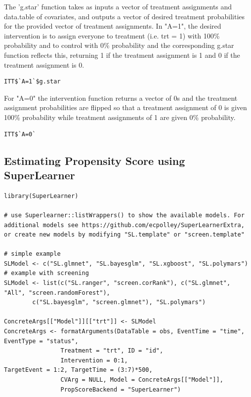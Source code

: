 \documentclass{report}
\newcommand{\1}{\ensuremath{\mathbf{1}}}
\begin{document}
The 'g.star' function takes as inputs a vector of treatment assignments and data.table of covariates, and outputs a vector of desired treatment probabilities for the provided vector of treatment assignments. In "A=1", the desired intervention is to assign everyone to treatment (i.e. trt = 1) with 100\% probability and to control with 0\% probability and the corresponding g.star function reflects this, returning 1 if the treatment assignment is 1 and 0 if the treatment assignment is 0.

\begin{lstlisting}
ITT$`A=1`$g.star
\end{lstlisting}

For "A=0" the intervention function returns a vector of 0s and the treatment assignment probabilities are flipped so that a treatment assignment of 0 is given 100\% probability while treatment assignments of 1 are given 0\% probability.

\begin{lstlisting}
ITT$`A=0`
\end{lstlisting}

\subsection{Estimating Propensity Score using SuperLearner}
\label{sec:orgb2fe7ca}


\begin{lstlisting}
library(SuperLearner)

# use Superlearner::listWrappers() to show the available models. For additional models see https://github.com/ecpolley/SuperLearnerExtra, or create new models by modifying "SL.template" or "screen.template"

# simple example
SLModel <- c("SL.glmnet", "SL.bayesglm", "SL.xgboost", "SL.polymars")
# example with screening
SLModel <- list(c("SL.ranger", "screen.corRank"), c("SL.glmnet", "All", "screen.randomForest"), 
		c("SL.bayesglm", "screen.glmnet"), "SL.polymars")

ConcreteArgs[["Model"]][["trt"]] <- SLModel
ConcreteArgs <- formatArguments(DataTable = obs, EventTime = "time", EventType = "status", 
				Treatment = "trt", ID = "id", 
				Intervention = 0:1,
TargetEvent = 1:2, TargetTime = (3:7)*500, 
				CVArg = NULL, Model = ConcreteArgs[["Model"]], 
				PropScoreBackend = "SuperLearner")
\end{lstlisting}
\end{document}
